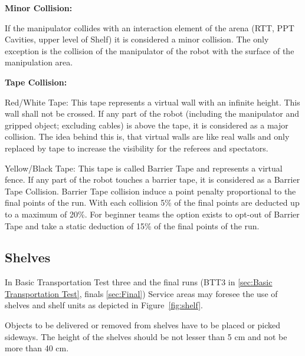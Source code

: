 \textbf{Minor Collision:}

If the manipulator collides with an interaction element of the arena (RTT, PPT Cavities, upper level
of Shelf) it is considered a minor collision. The only exception is the collision of the manipulator
of the robot with the surface of the manipulation area.

\textbf{Tape Collision:}

Red/White Tape: 
This tape represents a virtual wall with an infinite height. This wall shall not be crossed. If any part of the robot (including the manipulator and gripped object; excluding cables) is above the tape, it is considered as a major collision. The idea behind this is, that virtual walls are like real walls and only replaced by tape to increase the visibility for the referees and spectators.

Yellow/Black Tape: 
This tape is called Barrier Tape and represents a virtual fence. If any
part of the robot touches a barrier tape, it is considered as a Barrier Tape Collision. Barrier
Tape collision induce a point penalty proportional to the final points of the run. With
each collision 5\% of the final points are deducted up to a maximum of 20\%. For beginner
teams the option exists to opt-out of Barrier Tape and take a static deduction of 15\% of
the final points of the run.




\subsection{Shelves}\label{sec:Shelves}
In Basic Transportation Test three and the final runs (BTT3 in \ref{sec:Basic Transportation Test}, finals \ref{sec:Final}) Service areas may foresee the use of shelves and shelf units as depicted in Figure~\ref{fig:shelf}. 

Objects to be delivered or removed from shelves have to be placed or picked sideways. The height of the shelves should be not lesser than 5 cm and not be more than 40 cm.

